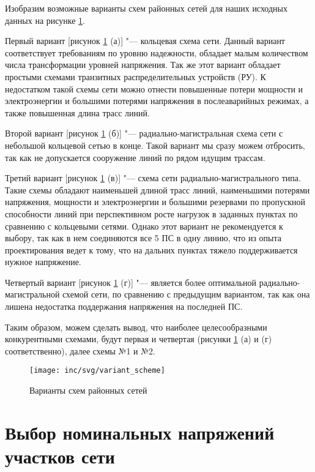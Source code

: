 Изобразим возможные варианты схем районных сетей для наших исходных данных на рисунке \ref{fig:variant_scheme}.

Первый вариант [рисунок \ref{fig:variant_scheme} (а)] "--- кольцевая схема сети. Данный вариант соответствует требованиям по уровню надежности, обладает малым количеством числа трансформации уровней напряжения. Так же этот вариант обладает простыми схемами транзитных распределительных устройств (РУ). К недостатком такой схемы сети можно отнести повышенные потери мощности и электроэнергии и большими потерями напряжения в послеаварийных режимах, а также повышенная длина трасс линий.

Второй вариант [рисунок \ref{fig:variant_scheme} (б)] "--- радиально-магистральная схема сети с небольшой кольцевой сетью в конце. Такой вариант мы сразу можем отбросить, так как не допускается сооружение линий по рядом идущим трассам.

Третий вариант [рисунок \ref{fig:variant_scheme} (в)] "--- схема сети радиально-магистрального типа. Такие схемы обладают наименьшей длиной трасс линий, наименьшими потерями напряжения, мощности и электроэнергии и большими резервами по пропускной способности линий при перспективном росте нагрузок в заданных пунктах по сравнению с кольцевыми сетями. Однако этот вариант не рекомендуется к выбору, так как в нем соединяются все 5 ПС в одну линию, что из опыта проектирования ведет к тому, что на дальних пунктах тяжело поддерживается нужное напряжение.

Четвертый вариант [рисунок \ref{fig:variant_scheme} (г)] "--- является более оптимальной радиально-магистральной схемой сети, по сравнению с предыдущим вариантом, так как она лишена недостатка поддержания напряжения на последней ПС.

Таким образом, можем сделать вывод, что наиболее целесообразными конкурентными схемами, будут первая и четвертая (рисунки \ref{fig:variant_scheme} (а) и (г) соответственно), далее схемы №1 и №2.

\begin{figure}[h]
	\centering
	\texttt{[image: inc/svg/variant\_scheme]}
	\caption{Варианты схем районных сетей}
	\label{fig:variant_scheme}
\end{figure}


\section{Выбор номинальных напряжений участков сети}

